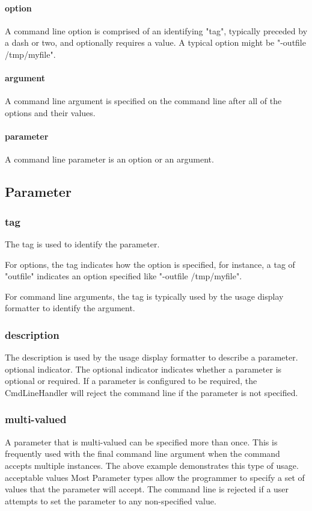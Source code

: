 \documentclass[a4paper,10pt]{article}
\begin{document}
\paragraph{option}
    A command line option is comprised of an identifying "tag", typically preceded by a dash or two, and optionally requires a value. A typical option might be "-outfile /tmp/myfile".
\paragraph{argument}
    A command line argument is specified on the command line after all of the options and their values.
\paragraph{parameter}
    A command line parameter is an option or an argument. 
\subsection{Parameter}
\subsubsection{tag}
The tag is used to identify the parameter.

For options, the tag indicates how the option is specified, for instance, a tag of "outfile" indicates an option specified like "-outfile /tmp/myfile".

For command line arguments, the tag is typically used by the usage display formatter to identify the argument.
\subsubsection{description}
The description is used by the usage display formatter to describe a parameter.
optional indicator. The optional indicator indicates whether a parameter is optional or required.
 If a parameter is configured to be required, the CmdLineHandler will reject the command line if the parameter is not specified.
\subsubsection{multi-valued}
A parameter that is multi-valued can be specified more than once. 
This is frequently used with the final command line argument when the command accepts multiple instances. 
The above example demonstrates this type of usage.
acceptable values 	
Most Parameter types allow the programmer to specify a set of values that the parameter will accept. 
The command line is rejected if a user attempts to set the parameter to any non-specified value.
\end{document}
